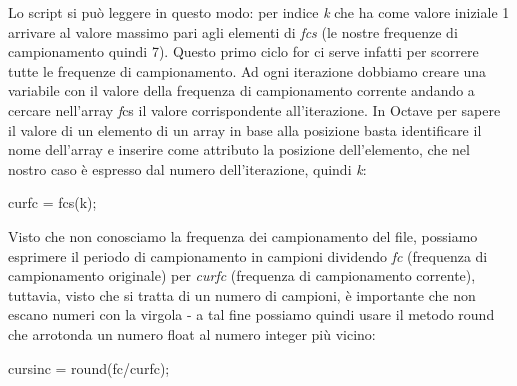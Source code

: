 \documentclass[11pt]{article}
\begin{document}
\begin{multicols*}{2}
\begin{center}
\begin{minipage}[c]{8cm}
\begin{sffamily}
\end{sffamily}
\end{minipage}
\end{center}

\noindent Lo script si può leggere in questo modo: per indice \textit k che ha come valore iniziale 1 arrivare al valore massimo pari agli elementi di \textit {fcs} (le nostre frequenze di campionamento quindi 7). Questo primo ciclo for ci serve infatti per scorrere tutte le frequenze di campionamento. Ad ogni iterazione dobbiamo creare una variabile con il valore della frequenza di campionamento corrente andando a cercare nell’array \textit fcs il valore corrispondente all’iterazione. In Octave per sapere il valore di un elemento di un array in base alla posizione basta identificare il nome dell’array e inserire come attributo la posizione dell’elemento, che nel nostro caso è espresso dal numero dell’iterazione, quindi \textit k:

\vspace{0.3cm}

\begin{center}
\begin{minipage}[c]{3cm}
\begin{sffamily}

curfc = fcs(k);\\

\end{sffamily}
\end{minipage}
\end{center}

\noindent Visto che non conosciamo la frequenza dei campionamento del file, possiamo esprimere il periodo di campionamento in campioni dividendo \textit {fc} (frequenza di campionamento originale) per \textit {curfc} (frequenza di campionamento corrente), tuttavia, visto che si tratta di un numero di campioni, è importante che non escano numeri con la virgola - a tal fine possiamo quindi usare il metodo round che arrotonda un numero float al numero integer più vicino:

\vspace{0.3cm}

\begin{center}
\begin{minipage}[c]{5cm}
\begin{sffamily}

cursinc = round(fc/curfc);\\

\end{sffamily}
\end{minipage}
\end{center}


\end{multicols*}
\end{document}
